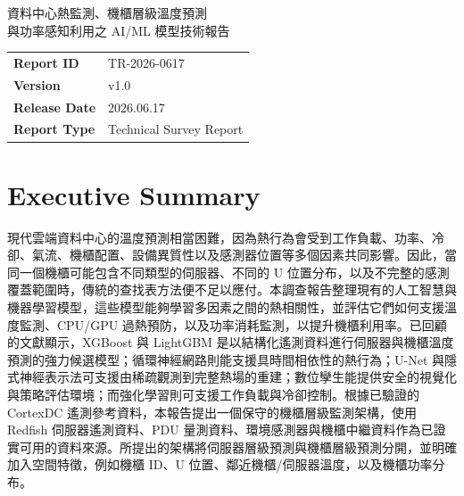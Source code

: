 \documentclass[12pt,a4paper]{article}
\begin{document}
\begin{titlepage}
\thispagestyle{empty}
\centering
\vspace*{1cm}

\vspace*{\fill}

{\Huge 資料中心熱監測、機櫃層級溫度預測\\
與功率感知利用之 AI/ML 模型技術報告\par}
\vspace{1.5cm}

\begin{tabular}{ll}
\toprule
\textbf{Report ID} & TR-2026-0617 \\
\textbf{Version} & v1.0 \\
\textbf{Release Date} & 2026.06.17 \\
\textbf{Report Type} & Technical Survey Report \\
\bottomrule
\end{tabular}

\vspace*{\fill}

\vspace{1.5cm}


\vfill
\end{titlepage}


\section*{Executive Summary}
現代雲端資料中心的溫度預測相當困難，因為熱行為會受到工作負載、功率、冷卻、氣流、機櫃配置、設備異質性以及感測器位置等多個因素共同影響。因此，當同一個機櫃可能包含不同類型的伺服器、不同的 U 位置分布，以及不完整的感測覆蓋範圍時，傳統的查找表方法便不足以應付。本調查報告整理現有的人工智慧與機器學習模型，這些模型能夠學習多因素之間的熱相關性，並評估它們如何支援溫度監測、CPU/GPU 過熱預防，以及功率消耗監測，以提升機櫃利用率。已回顧的文獻顯示，XGBoost 與 LightGBM 是以結構化遙測資料進行伺服器與機櫃溫度預測的強力候選模型；循環神經網路則能支援具時間相依性的熱行為；U-Net 與隱式神經表示法可支援由稀疏觀測到完整熱場的重建；數位孿生能提供安全的視覺化與策略評估環境；而強化學習則可支援工作負載與冷卻控制。根據已驗證的 CortexDC 遙測參考資料，本報告提出一個保守的機櫃層級監測架構，使用 Redfish 伺服器遙測資料、PDU 量測資料、環境感測器與機櫃中繼資料作為已證實可用的資料來源。所提出的架構將伺服器層級預測與機櫃層級預測分開，並明確加入空間特徵，例如機櫃 ID、U 位置、鄰近機櫃/伺服器溫度，以及機櫃功率分布。
\end{document}
